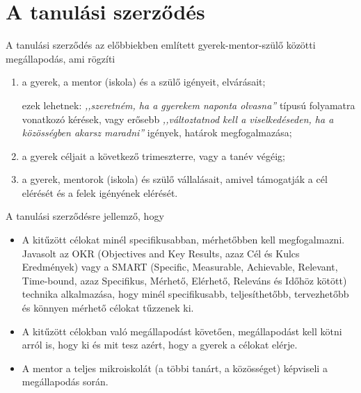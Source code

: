 \section{A tanulási szerződés}

A tanulási szerződés az előbbiekben említett gyerek-mentor-szülő közötti
megállapodás, ami rögzíti
\begin{enumerate}
      \item a gyerek, a mentor (iskola) és a szülő igényeit, elvárásait;

            ezek lehetnek: \emph{,,szeretném, ha a gyerekem naponta olvasna''}
            típusú
            folyamatra vonatkozó kérések, vagy erősebb \emph{,,változtatnod
                  kell a
                  viselkedéseden, ha a közösségben akarsz maradni''} igények,
            határok
            megfogalmazása;

      \item a gyerek céljait a következő trimeszterre, vagy a tanév végéig;

      \item a gyerek, mentorok (iskola) és szülő vállalásait, amivel támogatják
            a
            cél
            elérését és a felek igényének elérését.

\end{enumerate}

A tanulási szerződésre jellemző, hogy
\begin{itemize}
      \item A kitűzött célokat minél specifikusabban, mérhetőbben kell
            megfogalmazni.
            Javasolt az OKR  (Objectives and Key Results, azaz	Cél és Kulcs
            Eredmények)
            \citep{okr} vagy a SMART (Specific, Measurable, Achievable,
            Relevant,
            Time-bound, azaz Specifikus,  Mérhető, Elérhető, Releváns és Időhöz
            kötött)
            \citep{wiki:smart} technika alkalmazása, hogy minél specifikusabb,
            teljesíthetőbb, tervezhetőbb és könnyen mérhető célokat tűzzenek
            ki.

      \item A kitűzött célokban való megállapodást követően, megállapodást
            kell
            kötni arról is, hogy ki és mit tesz azért, hogy a gyerek a célokat
            elérje.

      \item A mentor a teljes mikroiskolát (a többi tanárt, a közösséget)
            képviseli
            a
            megállapodás során.
\end{itemize}

